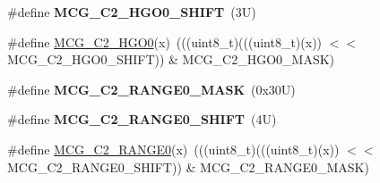\begin{DoxyCompactItemize}
\#define {\bfseries M\+C\+G\+\_\+\+C2\+\_\+\+H\+G\+O0\+\_\+\+S\+H\+I\+FT}~(3\+U)
\item 
\#define \mbox{\hyperlink{group___m_c_g___register___masks_ga669af3919c558cb8f8c77b8e75abf7cd}{M\+C\+G\+\_\+\+C2\+\_\+\+H\+G\+O0}}(x)~(((uint8\+\_\+t)(((uint8\+\_\+t)(x)) $<$$<$ M\+C\+G\+\_\+\+C2\+\_\+\+H\+G\+O0\+\_\+\+S\+H\+I\+FT)) \& M\+C\+G\+\_\+\+C2\+\_\+\+H\+G\+O0\+\_\+\+M\+A\+SK)
\item 
\mbox{\label{group___m_c_g___register___masks_ga5436f4e93034d8536c23eabcac1b1a43}} 
\#define {\bfseries M\+C\+G\+\_\+\+C2\+\_\+\+R\+A\+N\+G\+E0\+\_\+\+M\+A\+SK}~(0x30\+U)
\item 
\mbox{\label{group___m_c_g___register___masks_gaca9dfaea66978e556c7a9773e2c8c531}} 
\#define {\bfseries M\+C\+G\+\_\+\+C2\+\_\+\+R\+A\+N\+G\+E0\+\_\+\+S\+H\+I\+FT}~(4\+U)
\item 
\#define \mbox{\hyperlink{group___m_c_g___register___masks_ga4717ad2318b6cbc4586d554b59d0382e}{M\+C\+G\+\_\+\+C2\+\_\+\+R\+A\+N\+G\+E0}}(x)~(((uint8\+\_\+t)(((uint8\+\_\+t)(x)) $<$$<$ M\+C\+G\+\_\+\+C2\+\_\+\+R\+A\+N\+G\+E0\+\_\+\+S\+H\+I\+FT)) \& M\+C\+G\+\_\+\+C2\+\_\+\+R\+A\+N\+G\+E0\+\_\+\+M\+A\+SK)
\end{DoxyCompactItemize}
